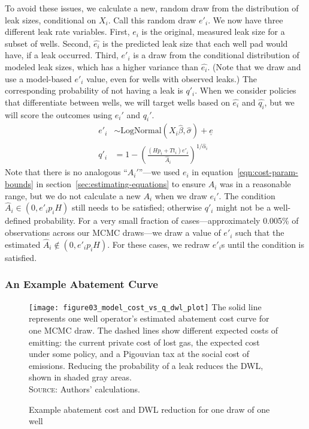 To avoid these issues, we calculate a new, random draw from the distribution of leak sizes, conditional on \(X_i\).
Call this random draw \(e'_i\).
We now have three different leak rate variables.
First, \(e_i\) is the original, measured leak size for a subset of wells.
Second, \(\hat{e_i}\) is the predicted leak size that each well pad would have, if a leak occurred.
Third, \(e'_i\) is a draw from the conditional distribution of modeled leak sizes, which has a higher variance than \(\hat{e_i}\).
(Note that we draw and use a model-based \(e'_i\) value, even for wells with observed leaks.)
The corresponding probability of not having a leak is \(q'_i\).
When we consider policies that differentiate between wells, we will target wells based on \(\hat{e_i} \) and \(\hat{q_i}\), but we will score the outcomes using \(e_i'\) and \(q_i'\).
\begin{align*}
e'_i &\sim \text{LogNormal}(X_i \hat{\beta}, \hat{\sigma}) + \underline{e} \\
q'_i &= 1 - \left(\frac{(H p_i + T t_i) e'_i}{\hat{A}_i}\right) ^{1 / \hat{\alpha}_i}
\end{align*}
Note that there is no analogous ``\(A_i'\)''---we used \(e_i\) in equation~\ref{eqn:cost-param-bounds} in section~\ref{sec:estimating-equations} to ensure \(A_i\) was in a reasonable range, but we do not calculate a new \(A_i\) when we draw \(e_i'\).
The condition \(\hat{A}_i \in (0, e'_i p_i H)\) still needs to be satisfied; otherwise \(q'_i\) might not be a well-defined probability.
For a very small fraction of cases---approximately 0.005\% of observations across our \gls{MCMC} draws---we draw a value of \(e'_i\) such that the estimated \(\hat{A}_i \notin (0, e'_i p_i H)\).
For these cases, we redraw \(e'_i\)s until the condition is satisfied.

\subsubsection{An Example Abatement Curve}

\begin{figure}[!bth]
\caption{Example abatement cost and \gls{DWL} reduction for one draw of one well}
\label{fig:abatement-dwl-demo}
\texttt{[image: figure03\_model\_cost\_vs\_q\_dwl\_plot]}
{\small\singlespacing
\vspace*{-1\baselineskip}
The solid line represents one well operator's estimated abatement cost curve for one \gls{MCMC} draw.
The dashed lines show different expected costs of emitting: the current private cost of lost gas, the expected cost under some policy, and a Pigouvian tax at the social cost of emissions.
Reducing the probability of a leak reduces the \gls{DWL}, shown in shaded gray areas.\\
\textsc{Source:} Authors' calculations.
}
\end{figure}

